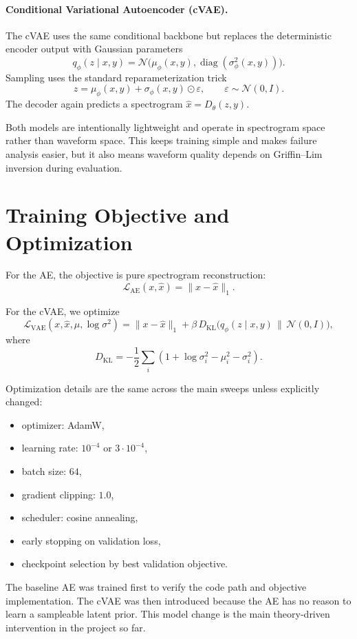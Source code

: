 \documentclass[10pt]{article}
\begin{document}
\paragraph{Conditional Variational Autoencoder (cVAE).}
The cVAE uses the same conditional backbone but replaces the deterministic encoder output with Gaussian parameters
\[
q_\phi(z \mid x, y) = \mathcal{N}\bigl(\mu_\phi(x,y), \operatorname{diag}(\sigma_\phi^2(x,y))\bigr).
\]
Sampling uses the standard reparameterization trick
\[
z = \mu_\phi(x,y) + \sigma_\phi(x,y)\odot \varepsilon,\qquad \varepsilon \sim \mathcal{N}(0, I).
\]
The decoder again predicts a spectrogram \(\hat{x} = D_\theta(z, y)\).

Both models are intentionally lightweight and operate in spectrogram space rather than waveform space.
This keeps training simple and makes failure analysis easier, but it also means waveform quality depends on Griffin--Lim inversion during evaluation.

\section{Training Objective and Optimization}
For the AE, the objective is pure spectrogram reconstruction:
\[
\mathcal{L}_{\text{AE}}(x,\hat{x}) = \|x - \hat{x}\|_1.
\]

For the cVAE, we optimize
\[
\mathcal{L}_{\text{VAE}}(x,\hat{x},\mu,\log \sigma^2)
= \|x - \hat{x}\|_1
+ \beta \, D_{\mathrm{KL}}\bigl(q_\phi(z \mid x,y)\,\|\,\mathcal{N}(0,I)\bigr),
\]
where
\[
D_{\mathrm{KL}} = -\frac{1}{2}\sum_i \left(1 + \log \sigma_i^2 - \mu_i^2 - \sigma_i^2\right).
\]

Optimization details are the same across the main sweeps unless explicitly changed:
\begin{itemize}
\item optimizer: AdamW,
\item learning rate: \(10^{-4}\) or \(3\cdot 10^{-4}\),
\item batch size: \(64\),
\item gradient clipping: \(1.0\),
\item scheduler: cosine annealing,
\item early stopping on validation loss,
\item checkpoint selection by best validation objective.
\end{itemize}

The baseline AE was trained first to verify the code path and objective implementation.
The cVAE was then introduced because the AE has no reason to learn a sampleable latent prior.
This model change is the main theory-driven intervention in the project so far.
\end{document}
